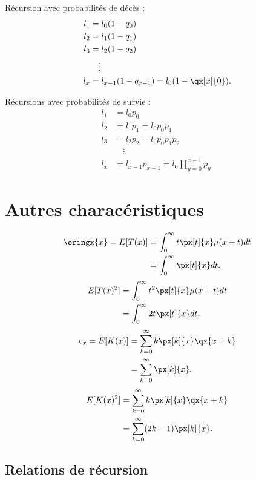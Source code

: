 \begin{multicols}{2}
	Récursion avec probabilités de décès :
	\begin{align*}
	l_1 &= l_0(1 - q_0) \\
	l_2 &= l_1(1 - q_1) \\
	l_3 &= l_2(1 - q_2) \\
	& \quad\vdots\\
	l_x &= l_{x-1}(1 - q_{x-1}) = l_0(1 - \qx[x]{0}).
	\end{align*}
	\columnbreak
	
	Récursions avec probabilités de survie : 
	\begin{align*}
	l_1 &= l_0 p_0\\
	l_2 &= l_1 p_1 = l_0 p_0p_1\\
	l_3 &= l_2 p_2 = l_0 p_0p_1p_2\\
	&\quad \vdots \\
	l_x &= l_{x-1}p_{x-1} = l_0 \prod_{y = 0}^{x-1}p_y.
	\end{align*}
\end{multicols}

\section{Autres characéristiques}

\begin{multicols}{2}
	\begin{align*}
	\eringx{x} = E[T(x)]&= \int_{0}^{\infty} t \px[t]{x}\mu(x + t)dt\\
	&= \int_{0}^{\infty} \px[t]{x}dt.
	\end{align*}
	\begin{align*}
	E[T(x)^2]&= \int_{0}^{\infty} t^2 \px[t]{x}\mu(x + t)dt\\
	&= \int_{0}^{\infty} 2t\px[t]{x}dt.
	\end{align*}
	\begin{align*}
	e_{x} = E[K(x)]&= \sum_{k = 0}^{\infty} k \px[k]{x}\qx{x + k}\\
	&= \sum_{k = 0}^{\infty}\px[k]{x}.
	\end{align*}
	\begin{align*}
	E[K(x)^2]&= \sum_{k = 0}^{\infty} k \px[k]{x}\qx{x + k}\\
	&= \sum_{k = 0}^{\infty}(2k-1)\px[k]{x}.
	\end{align*}
\end{multicols}

\subsection{Relations de récursion}

